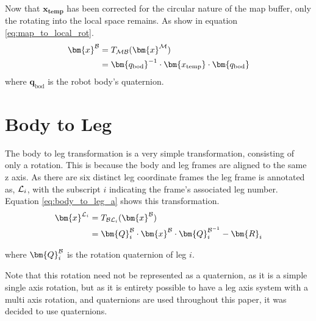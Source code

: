         Now that \(\bm{x_\text{temp}}\) has been corrected for the circular nature of the map buffer, only the rotating into the local space remains. As show in equation \ref{eq:map_to_local_rot}.
        \begin{align} \label{eq:map_to_local_rot}
        \begin{split}
            \bm{x}\inrefframe{\fbody} &= \transframe{\bm{x}\inrefframe{\fmap}}{\fmap}{\fbody} \\
            &= \bm{q_\text{bod}}^{-1} \cdot \bm{x_\text{temp}} \cdot \bm{q_\text{bod}}
        \end{split}
        \end{align}
        where \(\bm{q}_\text{bod}\) is the robot body's quaternion.
    
    \section{Body to Leg}
    The body to leg transformation is a very simple transformation, consisting of only a rotation. This is because
    the body and leg frames are aligned to the same z axis. As there are six distinct leg coordinate frames the leg frame is
    annotated as, \(\fleg\), with the subscript \(i\) indicating the frame's associated leg number. Equation \ref{eq:body_to_leg_a}
    shows this transformation.
    \begin{equation}\label{eq:body_to_leg_a}
        \begin{split}
            \bm{x}^\fleg &= \transframe{\bm{x}^\fbody}{\fbody}{\fleg} \\
            & = \bm{Q}_i^\fbody\cdot\bm{x}^\fbody\cdot\bm{Q}^{\fbody^{-1}}_{i} - \bm{R}_i
        \end{split}
        \end{equation}

    \noindent
    where \(\bm{Q}_i^\fbody\) is the rotation quaternion of leg \(i\).
    
    Note that this rotation need not be represented as a
    quaternion, as it is a simple single axis rotation, but as it is entirety possible to have a leg axis system with a multi axis
    rotation, and quaternions are used throughout this paper, it was decided to use quaternions.